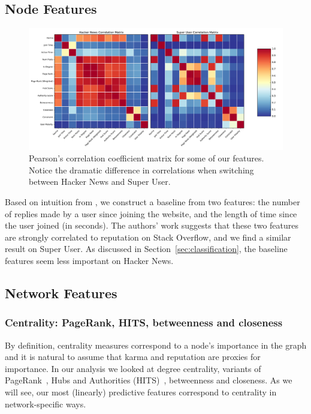 \documentclass[11pt]{article}
\begin{document}
\subsection{Node Features}
\begin{figure}[t]
\centering

\includegraphics[width=\linewidth]{correlation-png}
\caption{Pearson's correlation coefficient matrix for some of our features.
Notice the dramatic difference in correlations when switching between 
Hacker News and Super User.}
\label{fig:correlation}
\end{figure}
Based on intuition from \citet{movshovitzanalysis}, we construct a baseline
from two features: the number of replies made by a user since joining the website,
and the length of time since the user joined (in seconds). The authors' work
suggests that these two features are strongly correlated to reputation on Stack
Overflow, and we find a similar result on Super User. As discussed in 
Section~\ref{sec:classification}, the baseline features seem less 
important on Hacker News.

\subsection{Network Features}

\subsubsection{Centrality: PageRank, HITS, betweenness and closeness}
\label{sec:centrality}

By definition, centrality measures correspond to a node's importance in the
graph and it is natural to assume that karma and reputation are proxies for
importance. In our analysis we looked at degree centrality, variants of
PageRank~\cite{page1999pagerank}, Hubs and Authorities
(HITS)~\cite{kleinberg1999authoritative}, betweenness and closeness. As we will
see, our most (linearly) predictive features correspond to centrality in
network-specific ways.
\end{document}
